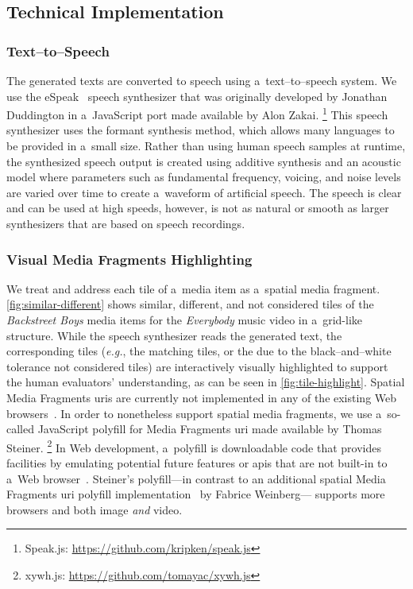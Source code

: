 \documentclass{article}
\begin{document}
\subsection{Technical Implementation}

\subsubsection{Text--to--Speech}

The generated texts are converted to speech using a~text--to--speech system.
We use the eSpeak~\cite{duddington2012espeak}
speech synthesizer that was originally developed by Jonathan Duddington
in a~JavaScript port made available by Alon Zakai.%
\footnote{Speak.js: \url{https://github.com/kripken/speak.js}}
This speech synthesizer uses the formant synthesis method,
which allows many languages to be provided in a~small size.
Rather than using human speech samples at runtime,
the synthesized speech output is created using additive synthesis
and an acoustic model where parameters
such as fundamental frequency, voicing, and noise levels
are varied over time to create a~waveform of artificial speech. 
The speech is clear and can be used at high speeds,
however, is not as natural or smooth as larger synthesizers
that are based on speech recordings.

\subsubsection{Visual Media Fragments Highlighting}

We treat and address each tile of a~media item as a~spatial media fragment.
\autoref{fig:similar-different} shows similar, different,
and not considered tiles of the \emph{Backstreet Boys} media items
for the \emph{Everybody} music video in a~grid-like structure.
While the speech synthesizer reads the generated text,
the corresponding tiles (\emph{e.g.}, the matching tiles,
or the due to the black--and--white tolerance not considered tiles)
are interactively visually highlighted
to support the human evaluators' understanding,
as can be seen in \autoref{fig:tile-highlight}.
Spatial Media Fragments {\sc uri}s are currently not implemented
in any of the existing Web browsers~\cite{weinberg2013polyfill}.
In order to nonetheless support spatial media fragments,
we use a~so-called JavaScript polyfill for Media Fragments {\sc uri}
made available by Thomas Steiner.%
\footnote{xywh.js: \url{https://github.com/tomayac/xywh.js}}
In Web development, a~polyfill is downloadable code
that provides facilities by emulating potential future features or {\sc api}s
that are not built-in to a~Web browser~\cite{sharp2010polyfill}.
Steiner's polyfill---in contrast to an additional spatial Media Fragments {\sc uri}
polyfill implementation~\cite{weinberg2013polyfill} by Fabrice Weinberg---%
supports more browsers and both image \emph{and} video.
\end{document}
